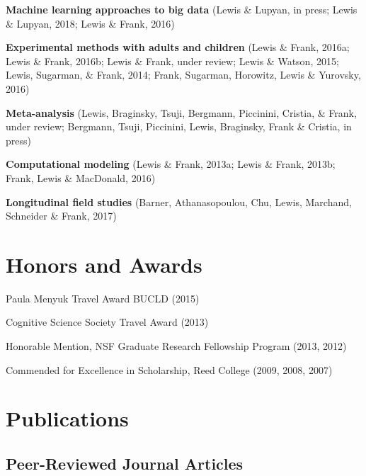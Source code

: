 \documentclass[letterpaper]{article}
\renewenvironment{itemize}{
  \begin{list}{}{
    \setlength{\leftmargin}{1.5em}
  }
}{
  \end{list}
}
\begin{document}
\begin{itemize}

  \item {\bf Machine learning approaches to big data} {\small(Lewis \& Lupyan,  in press; Lewis \& Lupyan, 2018; Lewis \& Frank, 2016)}
  
  \item {\bf Experimental methods with adults and children } {\small(Lewis \& Frank, 2016a; Lewis \& Frank, 2016b; Lewis \& Frank, under review; Lewis \& Watson, 2015; Lewis,  Sugarman, \& Frank, 2014; Frank, Sugarman, Horowitz,  Lewis \& Yurovsky, 2016)}
  
    \item {\bf Meta-analysis} {\small (Lewis,  Braginsky, Tsuji, Bergmann, Piccinini,  Cristia, \& Frank, under review; Bergmann, Tsuji,  Piccinini, Lewis, Braginsky,  Frank \& Cristia, in press)}

  \item {\bf Computational modeling} {\small(Lewis \& Frank, 2013a; Lewis \& Frank, 2013b; Frank,  Lewis  \& MacDonald,  2016)}

  \item {\bf Longitudinal field studies} {\small(Barner,  Athanasopoulou,   Chu,   Lewis,  Marchand, Schneider  \& Frank, 2017)}

\end{itemize}


\section*{Honors and Awards}
\begin{itemize}
\item Paula Menyuk Travel Award BUCLD (2015)
\item Cognitive Science Society Travel Award (2013)
\item Honorable Mention, NSF Graduate Research Fellowship Program (2013, 2012)
\item Commended for Excellence in Scholarship, Reed College (2009, 2008, 2007)
\end{itemize}



\section*{Publications}

\subsection*{Peer-Reviewed Journal Articles}
\end{document}
